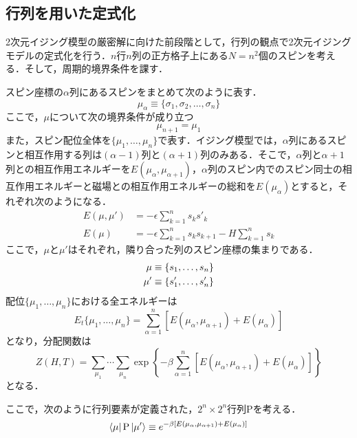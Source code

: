 \documentclass[a4paper,11pt]{jsreport}
\begin{document}
\subsection{行列を用いた定式化}
2次元イジング模型の厳密解に向けた前段階として，行列の観点で2次元イジングモデルの定式化を行う．$n$行$n$列の正方格子上にある$N=n^2$個のスピンを考える．そして，周期的境界条件を課す．\par
スピン座標の$\alpha$列にあるスピンをまとめて次のように表す．
\begin{equation}
  \mu_{\alpha}
  \equiv \{\sigma_1, \sigma_2, \dots, \sigma_n\}
\end{equation}
ここで，$\mu$について次の境界条件が成り立つ
\begin{equation}
  \mu_{n+1} = \mu_1 
\end{equation}
また，スピン配位全体を$\{\mu_1, \dots, \mu_n\}$で表す．イジング模型では，$\alpha$列にあるスピンと相互作用する列は$(\alpha-1)$列と$(\alpha+1)$列のみある．そこで，$\alpha$列と$\alpha+1$列との相互作用エネルギーを$E(\mu_{\alpha}, \mu_{\alpha+1})$，$\alpha$列のスピン内でのスピン同士の相互作用エネルギーと磁場との相互作用エネルギーの総和を$E(\mu_{\alpha})$とすると，それぞれ次のようになる．
\begin{align}
  E(\mu, \mu')
   & = -\epsilon \sum_{k=1}^n s_k s'_k                         \\
  E(\mu)
   & = -\epsilon \sum_{k=1}^n s_k s_{k+1} - H \sum_{k=1}^n s_k
\end{align}
ここで，$\mu$と$\mu'$はそれぞれ，隣り合った列のスピン座標の集まりである．
\begin{align}
  \mu  & \equiv \{s_1, \dots, s_n \} \notag \\
  \mu' & \equiv \{s'_1, \dots, s'_n \}
  \label{イジングエネルギー２}
\end{align}
配位$\{\mu_1, \dots, \mu_n\}$における全エネルギーは
\begin{equation}
  E_t\{\mu_1, \dots, \mu_n \}
  = \sum_{\alpha=1}^n [E(\mu_{\alpha}, \mu_{\alpha+1}) + E(\mu_{\alpha})]
\end{equation}
となり，分配関数は
\begin{equation}
  Z(H,T)
  = \sum_{\mu_1} \cdots \sum_{\mu_n} \exp{\left\{ -\beta \sum_{\alpha=1}^n [E(\mu_{\alpha}, \mu_{\alpha+1}) + E(\mu_{\alpha})] \right\}}
\end{equation}
となる．\par
ここで，次のように行列要素が定義された，$2^n \times 2^n$行列$\mathrm{P}$を考える．
\begin{equation}
  \bra{\mu} \mathrm{P} \ket{\mu'} \equiv e^{-\beta [E(\mu_{\alpha}, \mu_{\alpha+1}) + E(\mu_{\alpha})]}
  \label{行列要素}
\end{equation}
\end{document}
